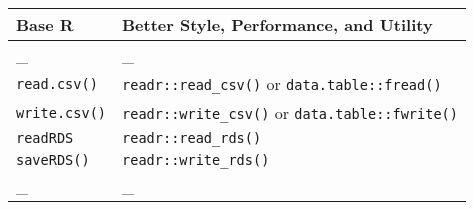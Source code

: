 \documentclass[
]{book}
\begin{document}
\begin{longtable}[]{@{}ll@{}}
\toprule
\begin{minipage}[b]{0.47\columnwidth}\raggedright
Base R\strut
\end{minipage} & \begin{minipage}[b]{0.47\columnwidth}\raggedright
Better Style, Performance, and Utility\strut
\end{minipage}\tabularnewline
\midrule
\endhead
\begin{minipage}[t]{0.47\columnwidth}\raggedright
\_\strut
\end{minipage} & \begin{minipage}[t]{0.47\columnwidth}\raggedright
\_\strut
\end{minipage}\tabularnewline
\begin{minipage}[t]{0.47\columnwidth}\raggedright
\texttt{read.csv()}\strut
\end{minipage} & \begin{minipage}[t]{0.47\columnwidth}\raggedright
\texttt{readr::read\_csv()} or \texttt{data.table::fread()}\strut
\end{minipage}\tabularnewline
\begin{minipage}[t]{0.47\columnwidth}\raggedright
\texttt{write.csv()}\strut
\end{minipage} & \begin{minipage}[t]{0.47\columnwidth}\raggedright
\texttt{readr::write\_csv()} or \texttt{data.table::fwrite()}\strut
\end{minipage}\tabularnewline
\begin{minipage}[t]{0.47\columnwidth}\raggedright
\texttt{readRDS}\strut
\end{minipage} & \begin{minipage}[t]{0.47\columnwidth}\raggedright
\texttt{readr::read\_rds()}\strut
\end{minipage}\tabularnewline
\begin{minipage}[t]{0.47\columnwidth}\raggedright
\texttt{saveRDS()}\strut
\end{minipage} & \begin{minipage}[t]{0.47\columnwidth}\raggedright
\texttt{readr::write\_rds()}\strut
\end{minipage}\tabularnewline
\begin{minipage}[t]{0.47\columnwidth}\raggedright
\_\strut
\end{minipage} & \begin{minipage}[t]{0.47\columnwidth}\raggedright
\_\strut
\end{minipage}\tabularnewline

\end{longtable}
\end{document}

